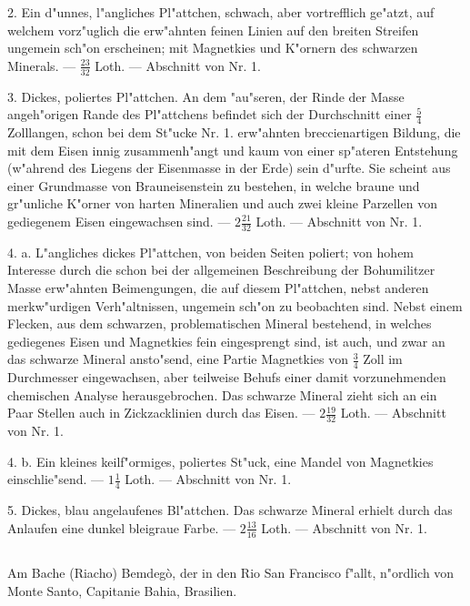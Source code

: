 \documentclass[a4paper, 11pt, oneside, polutonikogreek, german]{article}
\begin{document}
2. Ein d"unnes, l"angliches Pl"attchen, schwach, aber vortrefflich ge"atzt, auf welchem vorz"uglich die erw"ahnten feinen Linien auf den breiten Streifen ungemein sch"on erscheinen; mit Magnetkies und K"ornern des schwarzen Minerals. --- $\mathfrak{\frac{23}{32}}$ Loth. --- Abschnitt von Nr. 1.

3. Dickes, poliertes Pl"attchen. An dem "au"seren, der Rinde der Masse angeh"origen Rande des Pl"attchens befindet sich der Durchschnitt einer $\mathfrak{\frac{5}{4}}$ Zolllangen, schon bei dem St"ucke Nr. 1. erw"ahnten breccienartigen Bildung, die mit dem Eisen innig zusammenh"angt und kaum von einer sp"ateren Entstehung (w"ahrend des Liegens der Eisenmasse in der Erde) sein d"urfte. Sie scheint aus einer Grundmasse von Brauneisenstein zu bestehen, in welche braune und gr"unliche K"orner von harten Mineralien und auch zwei kleine Parzellen von gediegenem Eisen eingewachsen sind. --- $\mathfrak{2\frac{21}{32}}$ Loth. --- Abschnitt von Nr. 1.

4. a. L"angliches dickes Pl"attchen, von beiden Seiten poliert; von hohem Interesse durch die schon bei der allgemeinen Beschreibung der Bohumilitzer Masse erw"ahnten Beimengungen, die auf diesem Pl"attchen, nebst anderen merkw"urdigen Verh"altnissen, ungemein sch"on zu beobachten sind. Nebst einem Flecken, aus dem schwarzen, problematischen Mineral bestehend, in welches gediegenes Eisen und Magnetkies fein eingesprengt sind, ist auch, und zwar an das schwarze Mineral ansto"send, eine Partie Magnetkies von $\mathfrak{\frac{3}{4}}$ Zoll im Durchmesser eingewachsen, aber teilweise Behufs einer damit vorzunehmenden chemischen Analyse herausgebrochen. Das schwarze Mineral zieht sich an ein Paar Stellen auch in Zickzacklinien durch das Eisen. --- $\mathfrak{2\frac{19}{32}}$ Loth. --- Abschnitt von Nr. 1.

4. b. Ein kleines keilf"ormiges, poliertes St"uck, eine Mandel von Magnetkies einschlie"send. --- $\mathfrak{1\frac{1}{4}}$ Loth. --- Abschnitt von Nr. 1.

5. Dickes, blau angelaufenes Bl"attchen. Das schwarze Mineral erhielt durch das Anlaufen eine dunkel bleigraue Farbe. --- $\mathfrak{2\frac{13}{16}}$ Loth. --- Abschnitt von Nr. 1.
\subsection{}
\begin{center}

Am Bache (Riacho) Bemdegò, der in den Rio San Francisco f"allt, n"ordlich von Monte Santo, Capitanie Bahia, Brasilien.
\end{center}
\end{document}
